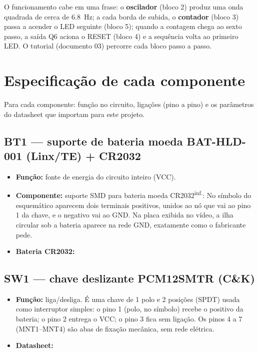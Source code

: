 \documentclass[11pt,a4paper]{article}
\newcommand{\inferido}{\textsuperscript{\textcolor{douradoEsc}{\sffamily inf.}}}
\begin{document}
O funcionamento cabe em uma frase: o \textbf{oscilador} (bloco 2) produz uma onda
quadrada de cerca de \SI{6,8}{\hertz}; a cada borda de subida, o \textbf{contador}
(bloco 3) passa a acender o LED seguinte (bloco 5); quando a contagem chega ao sexto
passo, a saída Q6 aciona o RESET (bloco 4) e a sequência volta ao primeiro LED. O
tutorial (documento 03) percorre cada bloco passo a passo.

\section{Especificação de cada componente}

Para cada componente: função no circuito, ligações (pino a pino) e os parâmetros do
datasheet que importam para este projeto.

\subsection{BT1 — suporte de bateria moeda BAT-HLD-001 (Linx/TE) + CR2032}
\begin{itemize}
  \item \textbf{Função:} fonte de energia do circuito inteiro (VCC).
  \item \textbf{Componente:} suporte SMD para bateria moeda CR2032\inferido: \DSsuporte{}
  No símbolo do esquemático aparecem dois terminais positivos, unidos ao nó que vai ao
  pino 1 da chave, e o negativo vai ao GND. Na placa exibida no vídeo, a ilha circular
  sob a bateria aparece na rede GND, exatamente como o fabricante pede.
  \item \textbf{Bateria CR2032:} \DSbat
\end{itemize}

\subsection{SW1 — chave deslizante PCM12SMTR (C\&K)}
\begin{itemize}
  \item \textbf{Função:} liga/desliga. É uma chave de 1 polo e 2 posições (SPDT) usada
  como interruptor simples: o pino 1 (polo, no símbolo) recebe o positivo da bateria;
  o pino 2 entrega o VCC; o pino 3 fica sem ligação. Os pinos 4 a 7 (MNT1–MNT4) são
  abas de fixação mecânica, sem rede elétrica.
  \item \textbf{Datasheet:} \DSsw
\end{itemize}
\end{document}
